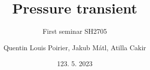 

\title[APROS simulations of BWR transients]{Pressure transient}
\subtitle{First seminar SH2705}
\author{Quentin Louis Poirier, Jakub Mátl, Atilla Cakir}
\date[24/05/23]{123. 5. 2023}
\usepackage{comment}

\usepackage[style=authoryear-ibid,backend=biber]{biblatex}
\usepackage{pgfplots}
\pgfplotsset{compat=1.18}



\nologo %




\frame{\titlepage}

%		
%
%		


